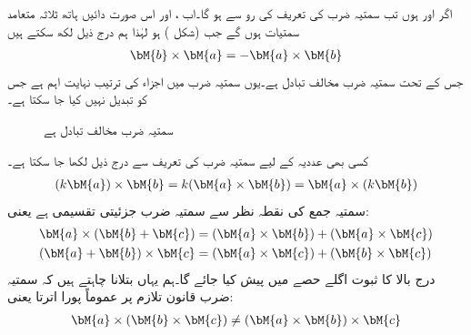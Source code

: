 اگر اور  ہوں تب سمتیہ ضرب کی تعریف کی رو سے   ہو گا۔اب  ،  اور  اس صورت دائیں ہاتھ ثلاثہ متعامد سمتیات ہوں گے جب  (شکل ) ہو لہٰذا ہم درج ذیل لکھ سکتے ہیں
\begin{align}
\bM{b} \times \bM{a}=-\bM{a}\times \bM{b}
\end{align}
جس کے تحت سمتیہ ضرب مخالف تبادل ہے۔یوں سمتیہ ضرب میں اجزاء کی ترتیب نہایت اہم ہے جس کو تبدیل نہیں کیا جا سکتا ہے۔
\begin{figure}
\centering
{}
\caption{سمتیہ ضرب مخالف تبادل ہے}
\label{شکل_الجبرا_مخالف_تبادل_سمتی_ضرب}
\end{figure}

کسی بھی عددیہ  کے لیے سمتیہ ضرب کی تعریف سے درج ذیل لکھا جا سکتا ہے۔
\begin{align}
(k\bM{a})\times \bM{b}=k(\bM{a}\times \bM{b})=\bM{a}\times(k\bM{b})
\end{align}
سمتیہ جمع کی نقطہ نظر سے سمتیہ ضرب جزئیتی تقسیمی ہے یعنی:
\begin{gather}
\begin{aligned}\label{مساوت_الجبرا_جزئیتی_تقسیم_برائے_سمتی_ضرب}
\bM{a}\times (\bM{b}+\bM{c})&=(\bM{a}\times \bM{b})+(\bM{a}\times \bM{c})\\
(\bM{a}+\bM{b})\times \bM{c}&=(\bM{a}\times \bM{c})+(\bM{b}\times \bM{c})
\end{aligned}
\end{gather}
درج بالا کا ثبوت اگلے حصے میں پیش کیا جائے گا۔ہم یہاں بتلانا چاہتے ہیں کہ سمتیہ ضرب قانون تلازم  پر عموماً پورا  اترتا یعنی:
\begin{align*}
\bM{a}\times (\bM{b}\times \bM{c}) \ne (\bM{a}\times \bM{b})\times \bM{c}
\end{align*}

